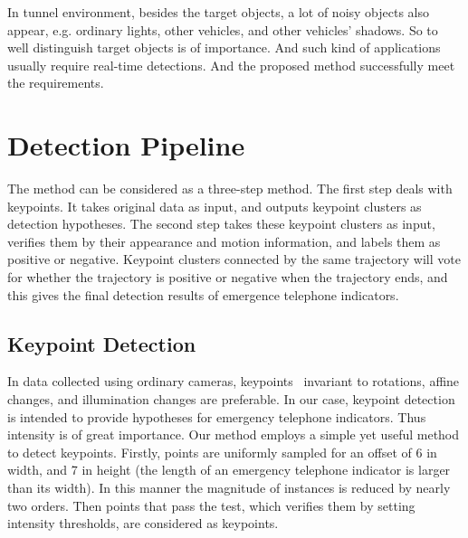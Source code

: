  In tunnel environment, besides the target objects, a lot of noisy objects also appear, e.g. ordinary lights, other vehicles, and other vehicles' shadows. So to well distinguish target objects is of importance. And such kind of applications usually require real-time detections. And the proposed method successfully meet the requirements.

\section{Detection Pipeline}
\label{pip}
The method can be considered as a three-step method. The first step deals with keypoints. It
takes original data as input, and outputs keypoint clusters as detection hypotheses. The second
step takes these keypoint clusters as input, verifies them by their appearance and motion
information, and labels them as positive or negative. Keypoint clusters connected by the same trajectory will vote for whether the trajectory is positive or negative when the trajectory ends, and this gives the final detection results of emergence telephone indicators.

\subsection{Keypoint Detection}

In data collected using ordinary cameras, keypoints~\citep{o2,o12} invariant to rotations, affine changes, and illumination changes are preferable. In our case, keypoint detection is intended to provide hypotheses for emergency telephone indicators. Thus intensity is of great importance. Our method employs a simple yet useful method to detect keypoints. Firstly, points are uniformly sampled for an offset of 6 in width, and 7 in height (the length of an emergency telephone indicator is larger than its width). In this manner the magnitude of instances is reduced by nearly two orders. Then points that pass the test, which verifies them by setting intensity thresholds, are considered as keypoints.

